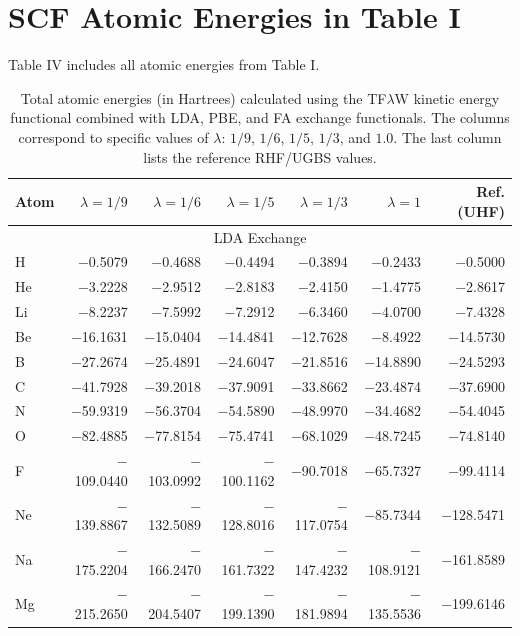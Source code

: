 \documentclass[%
 reprint,
 amsmath,amssymb,
 aps,
pra,
]{revtex4-2}
\begin{document}


\appendix*

\section{SCF Atomic Energies in Table I}

Table IV includes all atomic energies from Table I. 

\begin{table}[t]
\caption{Total atomic energies (in Hartrees) calculated using the TF$\lambda$W kinetic energy functional combined with LDA, PBE, and FA exchange functionals. The columns correspond to specific values of $\lambda$: $1/9$, $1/6$, $1/5$, $1/3$, and $1.0$. The last column lists the reference RHF/UGBS values.}
\label{tab:all_energies}
\footnotesize 
\begin{ruledtabular}
\begin{tabular}{lrrrrrr}
Atom & $\lambda=1/9$ & $\lambda=1/6$ & $\lambda=1/5$ & $\lambda=1/3$ & $\lambda=1$ & Ref. (UHF) \\
\hline
\multicolumn{7}{c}{LDA Exchange} \\
\hline
H  & $-$0.5079 & $-$0.4688 & $-$0.4494 & $-$0.3894 & $-$0.2433 & $-$0.5000 \\
He & $-$3.2228 & $-$2.9512 & $-$2.8183 & $-$2.4150 & $-$1.4775 & $-$2.8617 \\
Li & $-$8.2237 & $-$7.5992 & $-$7.2912 & $-$6.3460 & $-$4.0700 & $-$7.4328 \\
Be & $-$16.1631 & $-$15.0404 & $-$14.4841 & $-$12.7628 & $-$8.4922 & $-$14.5730 \\
B  & $-$27.2674 & $-$25.4891 & $-$24.6047 & $-$21.8516 & $-$14.8890 & $-$24.5293 \\
C  & $-$41.7928 & $-$39.2018 & $-$37.9091 & $-$33.8662 & $-$23.4874 & $-$37.6900 \\
N  & $-$59.9319 & $-$56.3704 & $-$54.5890 & $-$48.9970 & $-$34.4682 & $-$54.4045 \\
O  & $-$82.4885 & $-$77.8154 & $-$75.4741 & $-$68.1029 & $-$48.7245 & $-$74.8140 \\
F  & $-$109.0440 & $-$103.0992 & $-$100.1162 & $-$90.7018 & $-$65.7327 & $-$99.4114 \\
Ne & $-$139.8867 & $-$132.5089 & $-$128.8016 & $-$117.0754 & $-$85.7344 & $-$128.5471 \\
Na & $-$175.2204 & $-$166.2470 & $-$161.7322 & $-$147.4232 & $-$108.9121 & $-$161.8589 \\
Mg & $-$215.2650 & $-$204.5407 & $-$199.1390 & $-$181.9894 & $-$135.5536 & $-$199.6146 \\

\end{tabular}
\end{ruledtabular}
\end{table}
\end{document}
